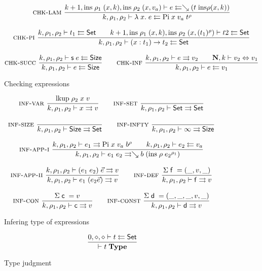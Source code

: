 \begin{figure}[p]

\begin{gather*}
\mbox{\sc chk-lam}\ \dfrac{k+1,\mathrm{ins} \; \rho_1 \; (x,k),\mathrm{ins} \; \rho_2 \; (x,v_a)\vdash e\leftleftarrows\searrow (t \; \mathrm{ins} \rho (x,k))}{k,\rho_1,\rho_2\vdash\lambda\; x .\;{e}\leftleftarrows\mathrm{Pi} \; x \; v_a \; t^{\rho}}
\\[2ex]
\mbox{\sc chk-pi}\ \dfrac{k,\rho_1,\rho_2\vdash t_1\leftleftarrows\mathsf{Set}
\qquad
k+1,\mathrm{ins} \; \rho_1 \; (x,k),\mathrm{ins} \; \rho_2 \; (x,(t_1)^{\rho})\vdash t2\leftleftarrows\mathsf{Set}
}{k,\rho_1,\rho_2\vdash( x : t_1 ) \rightarrow{t_2}\leftleftarrows\mathsf{Set}}
\\[2ex]
\mbox{\sc chk-succ}\ \dfrac{k,\rho_1,\rho_2\vdash\mathsf{s}\; e\leftleftarrows\mathsf{Size}}{k,\rho_1,\rho_2\vdash e\leftleftarrows\mathsf{Size}}
\qquad
\mbox{\sc chk-inf}\ \dfrac{k,\rho_1,\rho_2\vdash e\rightrightarrows v_2
\qquad
\mathbf{N},k\vdash v_2\Leftrightarrow v_1}{k,\rho_1,\rho_2\vdash e\leftleftarrows v_1}
\end{gather*}
\caption{Checking expressions}
\end{figure}

\begin{figure}[p]
\begin{gather*}
	  \mbox{\sc inf-var}\ \dfrac{\mathrm{lkup} \; \rho_2 \; x \; v}{k,\rho_1,\rho_2\vdash x\rightrightarrows v}
\qquad	  \mbox{\sc inf-set}\ \dfrac{}{k,\rho_1,\rho_2\vdash\mathsf{Set}\rightrightarrows\mathsf{Set}}   
\\[2ex]
	  \mbox{\sc inf-size}\ \dfrac{}{k,\rho_1,\rho_2\vdash\mathsf{Size}\rightrightarrows\mathsf{Set}}
\qquad
	  \mbox{\sc inf-infty}\ \dfrac{}{k,\rho_1,\rho_2\vdash\infty\rightrightarrows\mathsf{Size}} 
\\[2ex]
\mbox{\sc inf-app-i}\ \dfrac{k,\rho_1,\rho_2\vdash e_1\rightrightarrows\mathrm{Pi} \; x \; v_a \; b^{\rho}
\qquad k,\rho_1,\rho_2\vdash e_2\leftleftarrows v_a}{k,\rho_1,\rho_2\vdash e_1 \; e_2\rightrightarrows\searrow b \; (\mathrm{ins} \; \rho \; {e_2}^{\rho_1})}
\\[2ex]
\mbox{\sc inf-app-ii}\ \dfrac{k,\rho_1,\rho_2\vdash(e_1 \; e_2)\;\vec{e}\rightrightarrows v}{k,\rho_1,\rho_2\vdash e_1 \; (e_2 \vec{e})\rightrightarrows v}
\qquad
\mbox{\sc inf-def}\ \dfrac{\mathrm{\Sigma} \; \mathsf{f} \; = (\_,v,\_) }{k,\rho_1,\rho_2\vdash\mathsf{f}\rightrightarrows v}
\\[2ex]
\mbox{\sc inf-con}\ \dfrac{\mathrm{\Sigma} \; \mathsf{c} \; = v}{k,\rho_1,\rho_2\vdash\mathsf{c}\rightrightarrows v} 
\qquad
\mbox{\sc inf-const}\ \dfrac{\mathrm{\Sigma} \; \mathsf{d} \; = (\_,\_,\_,v,\_)}{k,\rho_1,\rho_2\vdash\mathsf{d}\rightrightarrows v}
\end{gather*}
\caption{Infering type of expressions}
\end{figure}

\begin{figure}
\begin{gather*}
\ \dfrac{0,\diamond,\diamond\vdash t\leftleftarrows\mathsf{Set}}{\vdash t\;\mathbf{Type}}
\end{gather*}
\caption{Type judgment}
\end{figure}

